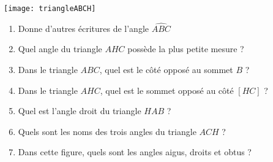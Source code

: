 
\begin{activite}

\texttt{[image: triangleABCH]}

\begin{enumerate}
\item Donne d'autres écritures de l'angle $\widehat{ABC}$ \dotfill

\item Quel angle du triangle $AHC$ possède la plus petite mesure ?  \dotfill

\item Dans le triangle $ABC$, quel est le côté opposé au sommet $B$ ?  \dotfill

\item Dans le triangle $AHC$, quel est le sommet opposé au côté $[HC]$ ?  \dotfill

\item Quel est l'angle droit du triangle $HAB$ ?  \dotfill

\item Quels sont les noms des trois angles du triangle $ACH$ ?  \dotfill

\item Dans cette figure, quels sont les angles aigus, droits et obtus ?  \dotfill

 \dotfill

 \dotfill
\end{enumerate}

\end{activite}



